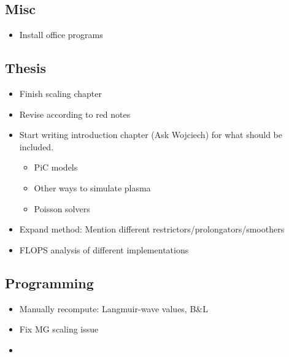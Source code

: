 \subsection{Misc}
    \begin{itemize}
        \item Install office programs
    \end{itemize}

\subsection{Thesis}
\begin{itemize}
  \item Finish scaling chapter
  \item Revise according to red notes
  \item Start writing introduction chapter (Ask Wojciech) for what should be included.
    \begin{itemize}
      \item PiC models
      \item Other ways to simulate plasma
      \item Poisson solvers
    \end{itemize}
  \item Expand method: Mention different restrictors/prolongators/smoothers
  \item FLOPS analysis of different implementations
\end{itemize}

\subsection{Programming}
\begin{itemize}
  \item Manually recompute: Langmuir-wave values, B&L
  \item Fix MG scaling issue
  \item
\end{itemize}
